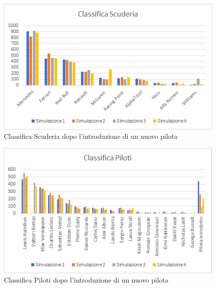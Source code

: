 \begin{figure}[h]
\centering
\includegraphics[width=0.9\linewidth]{images/Classifica Scuderia nuovo pilota.png}
\caption{Classifica Scuderia dopo l'introduzione di un nuovo pilota}
\label{fig:Classifica Scuderia dopo l'introduzione di un nuovo pilota}
\end{figure}
\begin{figure}[h]
\centering
\includegraphics[width=0.9\linewidth]{images/Classifica Piloti Nuovo Pilota.png}
\caption{Classifica Piloti dopo l'introduzione di un nuovo pilota}
\label{fig:CClassifica Piloti dopo l'introduzione di un nuovo pilota}
\end{figure}
\clearpage
